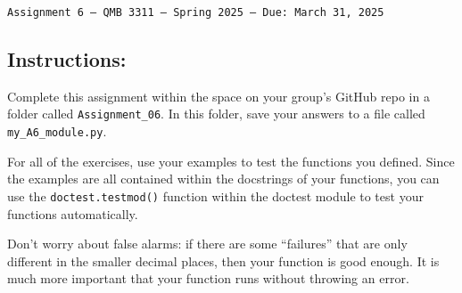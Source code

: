 \documentclass[11pt]{exam}
\begin{document}
\texttt{Assignment 6 --- QMB 3311 ---  Spring 2025  --- Due: March 31, 2025}

\subsection*{Instructions:}

Complete this assignment within the space on your group's GitHub repo in a folder called \texttt{Assignment\_06}. In this folder, save your answers to a file called \texttt{my\_A6\_module.py}.

For all of the exercises, use your examples to test the functions you defined. Since the examples are all contained within the docstrings of your functions, you can use the
\texttt{doctest.testmod()} function within the doctest module to test your functions automatically.

Don't worry about false alarms: if there are some ``failures'' that are only different in the smaller decimal places, then your function is good enough. It is much more important that your function runs without throwing an error.
\end{document}
